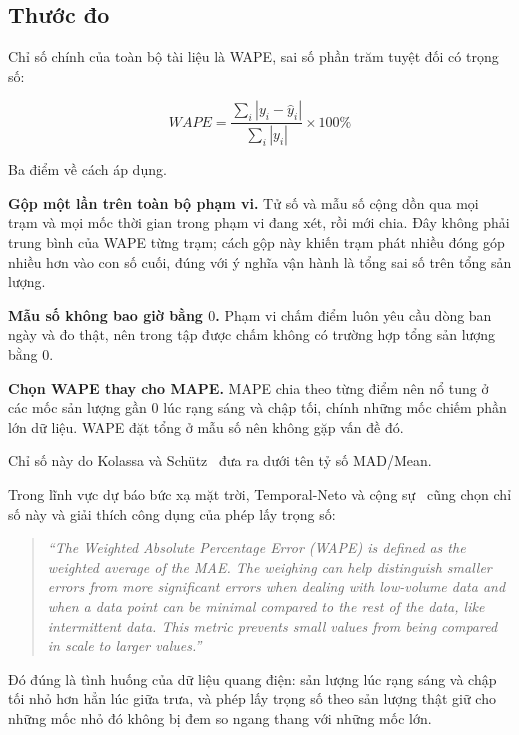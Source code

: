 \FloatBarrier
\subsection{Thước đo}

Chỉ số chính của toàn bộ tài liệu là WAPE, sai số phần trăm tuyệt đối có trọng số:

\begin{equation}
WAPE = \frac{\sum_i \left| y_i - \hat{y}_i \right|}{\sum_i \left| y_i \right|} \times 100\%
\end{equation}

Ba điểm về cách áp dụng.

\textbf{Gộp một lần trên toàn bộ phạm vi.} Tử số và mẫu số cộng dồn qua mọi trạm và mọi mốc
thời gian trong phạm vi đang xét, rồi mới chia. Đây không phải trung bình của WAPE từng trạm;
cách gộp này khiến trạm phát nhiều đóng góp nhiều hơn vào con số cuối, đúng với ý nghĩa vận
hành là tổng sai số trên tổng sản lượng.

\textbf{Mẫu số không bao giờ bằng $0$.} Phạm vi chấm điểm luôn yêu cầu dòng ban ngày và đo
thật, nên trong tập được chấm không có trường hợp tổng sản lượng bằng $0$.

\textbf{Chọn WAPE thay cho MAPE.} MAPE chia theo từng điểm nên nổ tung ở các mốc sản
lượng gần $0$ lúc rạng sáng và chập tối, chính những mốc chiếm phần lớn dữ liệu. WAPE đặt
tổng ở mẫu số nên không gặp vấn đề đó.

Chỉ số này do Kolassa và Schütz~\cite{kolassa2007mad} đưa ra dưới tên tỷ số MAD/Mean.

Trong lĩnh vực dự báo bức xạ mặt trời, Temporal-Neto và cộng sự~\cite{pin2025wape} cũng chọn
chỉ số này và giải thích công dụng của phép lấy trọng số:

\begin{quote}\small
\textit{``The Weighted Absolute Percentage Error (WAPE) is defined as the weighted average of
the MAE. The weighing can help distinguish smaller errors from more significant errors when
dealing with low-volume data and when a data point can be minimal compared to the rest of the
data, like intermittent data. This metric prevents small values from being compared in scale to
larger values.''}
\end{quote}

Đó đúng là tình huống của dữ liệu quang điện: sản lượng lúc rạng sáng và chập tối nhỏ hơn hẳn
lúc giữa trưa, và phép lấy trọng số theo sản lượng thật giữ cho những mốc nhỏ đó không bị đem so
ngang thang với những mốc lớn.


